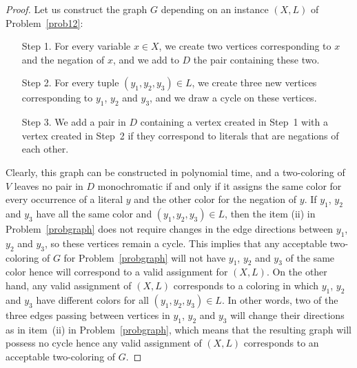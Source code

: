 \documentclass[a4paper,11pt]{article}
\numberwithin{equation}{section}
\begin{document}
\begin{proof}
Let us construct the graph $G$ depending on an instance $(X,L)$ of Problem~\ref{prob12}: 
\begin{itemize} \setlength{\itemindent}{0.5cm}  
\item[Step 1.] For every variable $x\in X$, we create two vertices corresponding to $x$ and the negation of $x$, and we add to $D$ the pair containing these two. 

\item[Step 2.] For every tuple $(y_1,y_2,y_3)\in L$, we create three new vertices corresponding to $y_1$, $y_2$ and $y_3$, and we draw a cycle on these vertices.  

\item[Step 3.] We add a pair in $D$ containing a vertex created in Step~1 with a vertex created in Step~2 if they correspond to literals that are negations of each other.  
\end{itemize} 

Clearly, this graph can be constructed in polynomial time, and a two-coloring of $V$ leaves no pair in $D$ monochromatic if and only if it assigns the same color for every occurrence of a literal $y$ and the other color for the negation of $y$. 
If $y_1$, $y_2$ and $y_3$ have all the same color and $(y_1,y_2,y_3)\in L$, then the item (ii) in Problem~\ref{probgraph} does not require changes in the edge directions between $y_1$, $y_2$ and $y_3$, so these vertices remain a cycle. This implies that any acceptable two-coloring of $G$ for Problem~\ref{probgraph} will not have $y_1$, $y_2$ and $y_3$ of the same color hence will correspond to a valid assignment for $(X,L)$. 
On the other hand, any valid assignment of $(X,L)$ corresponds to a coloring in which $y_1$, $y_2$ and $y_3$ have different colors 
for all $(y_1,y_2,y_3)\in L$. In other words, two of the three edges passing between vertices in $y_1$, $y_2$ and $y_3$ will change their directions as in item~(ii) in Problem~\ref{probgraph}, which means that the resulting graph will possess no cycle hence any valid assignment of $(X,L)$ corresponds to an acceptable two-coloring of $G$. 
\end{proof}
\end{document}

